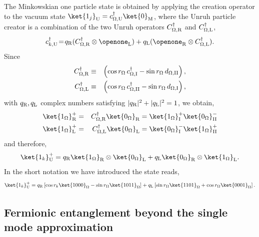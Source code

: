 The Minkowskian one particle state is obtained by applying the creation operator to the vacuum state $\ket{1_{j}}_{\text{U}}=c_{\Omega,\text{U}}^\dagger\ket{0}_\text{M}$,
where the Unruh particle creator is a combination of the two Unruh operators $C_{\Omega,\text{\text{R}}}^\dagger$ and $C_{\Omega,\text{\text{L}}}^\dagger$,
\begin{equation}\label{creat}
c_{k,\text{U}}^\dagger\!=\!q_\text{\text{R}}(C^\dagger_{\Omega,\text{\text{R}}}\otimes\openone_\text{\text{L}})+q_\text{\text{L}}(\openone_\text{\text{R}}\otimes C^\dagger_{\Omega,\text{\text{L}}}).
\end{equation}
Since
\begin{eqnarray}
C^\dagger_{\Omega,\text{\text{R}}}&\equiv&\left(\cos r_{\Omega}\, c^\dagger_{\Omega,\text{I}}-\sin r_{\Omega}\, d_{\Omega,\text{II}}\right),\\*
C^\dagger_{\Omega,\text{\text{L}}}&\equiv&\left(\cos r_{\Omega}\, c^\dagger_{\Omega,\text{II}}-\sin r_{\Omega}\, d_{\Omega,\text{I}}\right),\nonumber
\end{eqnarray}
with $q_\text{\text{R}},q_\text{\text{L}}$ complex numbers satisfying $|q_\text{\text{R}}|^2+|q_\text{\text{L}}|^2=1$,
we obtain,
\begin{eqnarray}
\ket{1_{\Omega}}^+_\text{\text{R}}&=&C^\dagger_{\Omega,\text{\text{R}}}\ket{0_{\Omega}}_\text{\text{R}}=\ket{1_{\Omega}}^+_\text{I}\ket{0_{\Omega}}^-_\text{II}\\*
\ket{1_{\Omega}}^+_\text{\text{L}}&=&C^\dagger_{\Omega,\text{\text{L}}}\ket{0_{\Omega}}_\text{\text{L}}=\ket{0_{\Omega}}^-_\text{I}\ket{1_{\Omega}}^+_\text{II}\nonumber
\end{eqnarray}
and therefore,
\begin{equation}
\ket{1_{k}}^+_\text{U}=q_\text{\text{R}}\ket{1_{\Omega}}_\text{\text{R}}\otimes\ket{0_{\Omega}}_\text{\text{L}}+q_\text{\text{L}}\ket{0_{\Omega}}_\text{\text{R}}\otimes\ket{1_{\Omega}}_\text{\text{L}}.
\end{equation}
In the short notation we have introduced the state reads,  
\begin{equation}\label{onegrassman}
\ket{1_{k}}^+_\text{U}= q_\text{\text{R}}\left[\cos r_{k}\ket{1000}_{\Omega}-\sin r_{\Omega}\ket{1011}_{\Omega}\right]
+q_\text{\text{L}}\left[\sin r_{\Omega}\ket{1101}_{\Omega}+\cos r_{\Omega}\ket{0001}_{\Omega}\right].
\end{equation}

\subsection{Fermionic entanglement beyond the single mode approximation}

